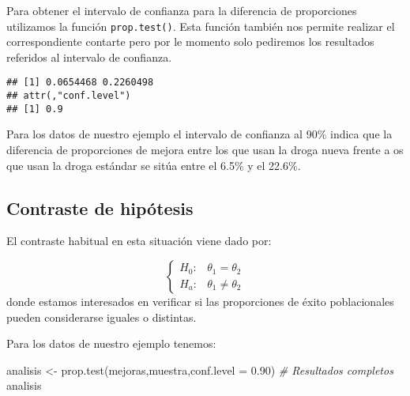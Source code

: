 \documentclass[
]{book}
\newenvironment{Shaded}{\begin{snugshade}}{\end{snugshade}}
\newcommand{\AttributeTok}[1]{\textcolor[rgb]{0.77,0.63,0.00}{#1}}
\newcommand{\CommentTok}[1]{\textcolor[rgb]{0.56,0.35,0.01}{\textit{#1}}}
\newcommand{\FloatTok}[1]{\textcolor[rgb]{0.00,0.00,0.81}{#1}}
\newcommand{\FunctionTok}[1]{\textcolor[rgb]{0.00,0.00,0.00}{#1}}
\newcommand{\NormalTok}[1]{#1}
\newcommand{\OtherTok}[1]{\textcolor[rgb]{0.56,0.35,0.01}{#1}}
\newcommand{\SpecialCharTok}[1]{\textcolor[rgb]{0.00,0.00,0.00}{#1}}
\begin{document}
Para obtener el intervalo de confianza para la diferencia de proporciones utilizamos la función \texttt{prop.test()}. Esta función también nos permite realizar el correspondiente contarte pero por le momento solo pediremos los resultados referidos al intervalo de confianza.

\begin{Shaded}
\end{Shaded}

\begin{verbatim}
## [1] 0.0654468 0.2260498
## attr(,"conf.level")
## [1] 0.9
\end{verbatim}

Para los datos de nuestro ejemplo el intervalo de confianza al 90\% indica que la diferencia de proporciones de mejora entre los que usan la droga nueva frente a os que usan la droga estándar se sitúa entre el 6.5\% y el 22.6\%.

\hypertarget{contraste-de-hipuxf3tesis-1}{%
\subsection{Contraste de hipótesis}\label{contraste-de-hipuxf3tesis-1}}

El contraste habitual en esta situación viene dado por:

\[\left\{\begin{array}{ll} H_0: & \theta_1 = \theta_2\\ H_a: & \theta_1 \neq \theta_2 \end{array}\right.\] donde estamos interesados en verificar si las proporciones de éxito poblacionales pueden considerarse iguales o distintas.

Para los datos de nuestro ejemplo tenemos:

\begin{Shaded}
\begin{Highlighting}[]
\NormalTok{analisis }\OtherTok{\textless{}{-}} \FunctionTok{prop.test}\NormalTok{(mejoras,muestra,}\AttributeTok{conf.level =} \FloatTok{0.90}\NormalTok{)}
\CommentTok{\# Resultados completos}
\NormalTok{analisis}
\end{Highlighting}
\end{Shaded}
\end{document}
